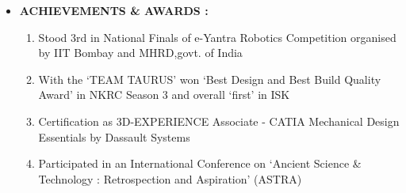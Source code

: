\documentclass[11pt]{article}
\begin{document}
\begin{itemize}[label=$\star$]
\newpage
\item	\begin{large} \textbf{ACHIEVEMENTS \& AWARDS :} \end{large}
\begin{enumerate}
	\item Stood 3rd in National Finals of e-Yantra Robotics Competition organised by IIT Bombay and 
	MHRD,govt. of India
	\item With the ‘TEAM TAURUS’ won ‘Best Design and Best Build Quality Award’ in NKRC Season 3 and overall ‘first’ in ISK 
	\item Certification as 3D-EXPERIENCE Associate - CATIA Mechanical Design Essentials by Dassault Systems
	\item Participated in an International Conference on ‘Ancient Science \& Technology : Retrospection and Aspiration’ (ASTRA)
\end{enumerate}



\end{itemize}
\end{document}
